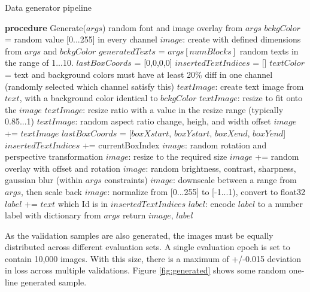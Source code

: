 \begin{algorithm}
\caption{Data generator pipeline}
\label{alg:data_generator_pipeline}
\begin{algorithmic}[1]
 \STATE \textbf{procedure} Generate($args$)
 \STATE random font and image overlay from $args$
 \STATE $bckgColor$ = random value [0...255] in every channel
 \STATE $image$: create with defined dimensions from $args$ and $bckgColor$
 \STATE $generatedTexts$ = $args[numBlocks]$ random texts in the range of 1...10.
 \STATE $lastBoxCoords$ = [0,0,0,0]
 \STATE $insertedTextIndices$ = []
 \STATE $textColor$ = text and background colors must have at least 20\% diff in one channel (randomly selected which channel satisfy this)
 \STATE $textImage$: create text image from $text$, with a background color identical to $bckgColor$
 \STATE $textImage$: resize to fit onto the $image$
 \ENDIF
 \STATE $textImage$: resize ratio with a value in the resize range (typically 0.85...1)
 \STATE $textImage$: random aspect ratio change, heigh, and width offset
 \STATE $image$ += $textImage$
 \STATE $lastBoxCoords$ = [$boxXstart$, $boxYstart$, $boxXend$, $boxYend$]
 \STATE $insertedTextIndices$ += currentBoxIndex
 \ENDIF
 \ENDFOR
 \STATE $image$: random rotation and perspective transformation
 \STATE $image$: resize to the required size
 \STATE $image$ += random overlay with offset and rotation
 \STATE $image$: random brightness, contrast, sharpness, gaussian blur (within $args$ constraints)
 \STATE $image$: downscale between a range from $args$, then scale back
 \STATE $image$: normalize from [0...255] to [-1...1), convert to float32
 \STATE $label$ += $text$ which Id is in $insertedTextIndices$
 \STATE $label$: encode $label$ to a number label with dictionary from $args$
 \STATE return $image$, $label$
\end{algorithmic}
\end{algorithm}

As the validation samples are also generated, the images must be equally distributed across different evaluation sets. A single evaluation epoch is set to contain 10,000 images. With this size, there is a maximum of +/-0.015 deviation in loss across multiple validations. Figure \ref{fig:generated} shows some random one-line generated sample.

